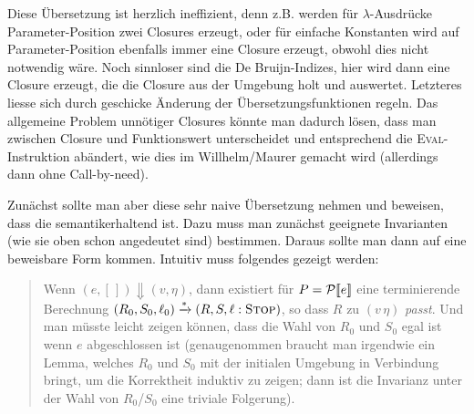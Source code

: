 \documentclass[12pt,fleqn]{article}
\begin{document}
Diese \"Ubersetzung ist herzlich ineffizient, denn z.B. werden f\"ur $\lambda$-Ausdr\"ucke Parameter-Position
zwei Closures erzeugt, oder f\"ur einfache Konstanten wird auf Parameter-Position ebenfalls immer eine Closure
erzeugt, obwohl dies nicht notwendig w\"are. Noch sinnloser sind die De Bruijn-Indizes, hier wird dann eine
Closure erzeugt, die die Closure aus der Umgebung holt und auswertet. Letzteres liesse sich durch geschicke
\"Anderung der \"Ubersetzungsfunktionen regeln. Das allgemeine Problem unn\"otiger Closures k\"onnte man dadurch
l\"osen, dass man zwischen Closure und Funktionswert unterscheidet und entsprechend die \textsc{Eval}-Instruktion
ab\"andert, wie dies im Willhelm/Maurer gemacht wird (allerdings dann ohne Call-by-need).

Zun\"achst sollte man aber diese sehr naive \"Ubersetzung nehmen und beweisen, dass die semantikerhaltend ist. Dazu
muss man zun\"achst geeignete Invarianten (wie sie oben schon angedeutet sind) bestimmen. Daraus sollte man dann
auf eine beweisbare Form kommen. Intuitiv muss folgendes gezeigt werden:
\begin{quote}
  Wenn $(e,[\,]) \Downarrow (v,\eta)$, dann existiert f\"ur $P=\mathcal{P}\llbracket e \rrbracket$ eine terminierende Berechnung
  $(R_0,S_0,\ell_0) \xrightarrow* (R,S,\ell:\textsc{Stop})$, so dass $R$ zu $(v\,\eta)$ {\em passt}. Und man
  m\"usste leicht zeigen k\"onnen, dass die Wahl von $R_0$ und $S_0$ egal ist wenn $e$ abgeschlossen ist (genaugenommen
  braucht man irgendwie ein Lemma, welches $R_0$ und $S_0$ mit der initialen Umgebung in Verbindung bringt, um die
  Korrektheit induktiv zu zeigen; dann ist die Invarianz unter der Wahl von $R_0$/$S_0$ eine triviale Folgerung).
\end{quote}
\end{document}
